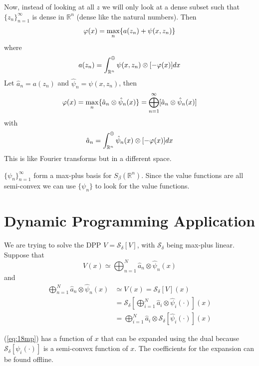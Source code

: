 Now, instead of looking at all $z$ we will only look at a dense subset such that $\{z_n\}_{n=1}^\infty$ is dense in $\mathbb{R}^n$ (dense like the natural numbers). Then
$$\varphi(x) = \max_n\{a(z_n) + \psi(x,z_n)\}$$
where
$$a(z_n) = \int_{\mathbb{R}^n}^\oplus \psi(x,z_n)\otimes [-\varphi(x)]dx$$
Let $\hat{a}_n=a(z_n)$ and $\hat{\psi}_n=\psi(x,z_n)$, then
\begin{align}
\label{eq:18vpx}
\varphi(x) = \max_n\{\hat{a}_n\otimes\hat{\psi}_n(x)\} = \bigoplus_{n=1}^\infty[\hat{a}_n\otimes\hat{\psi}_n(x)]
\end{align}
with
$$\hat{a}_n = \int_{\mathbb{R}^n}^\oplus \hat{\psi}_n(x)\otimes [-\varphi(x)]dx$$
This is like Fourier transforms but in a different space.

$\{\psi_n\}_{n=1}^\infty$ form a max-plus basis for $S_\beta(\mathbb{R}^n)$. Since the value functions are all semi-convex we can use $\{\psi_n\}$ to look for the value functions.

\section{Dynamic Programming Application}
We are trying to solve the DPP $V=\mathcal{S}_\delta[V]$, with $\mathcal{S}_\delta$ being max-plus linear. Suppose that
$$V(x)\simeq \bigoplus_{n=1}^N\hat{a}_n\otimes\hat{\psi}_n(x)$$
and
\begin{align}
\label{eq:18mp}
\bigoplus_{n=1}^N\hat{a}_n\otimes\hat{\psi}_n(x) &\simeq V(x) = \mathcal{S}_\delta[V](x) \nonumber \\
&= \mathcal{S}_\delta\left[\bigoplus_{i=1}^N\hat{a}_i\otimes\hat{\psi}_i(\cdot)\right](x) \nonumber \\
&= \bigoplus_{i=1}^N\hat{a}_i\otimes\mathcal{S}_\delta[\hat{\psi}_i(\cdot)](x)
\end{align}

(\ref{eq:18mp}) has a function of $x$ that can be expanded using the dual because $\mathcal{S}_\delta[\psi_i(\cdot)]$ is a semi-convex function of $x$. The coefficients for the expansion can be found offline.

